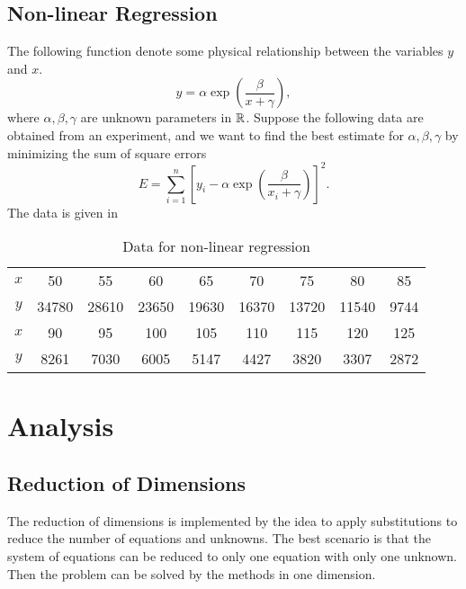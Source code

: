 \subsection{Non-linear Regression}
The following function denote some physical relationship between the variables \(y\) and \(x\).
\[ y=\alpha\exp\left(\frac{\beta}{x+\gamma}\right), \]
where \(\alpha,\beta,\gamma\) are unknown parameters in \(\mathbb{R}\).
Suppose the following data are obtained from an experiment, and we want to find the best estimate for \(\alpha,\beta,\gamma\) by minimizing the sum of square errors
\begin{equation}\label{sse}
E=\sum_{i=1}^{n} \left[  y_i-\alpha\exp\left(\frac{\beta}{x_i+\gamma}\right) \right]^2.
\end{equation}
The data is given in
\ifnum{}
	\begin{table}[H]
\else
	\begin{table}[htbp]
\fi
	\centering
	\begin{tabular}{ccccccccc}
	\hline
	\(x\)	&	50	&	55	&	60	&	65	&	70	&	75	&	80	&	85	\\
	\(y\)	&	34780	&	28610	&	23650	&	19630	&	16370	&	13720	&	11540	&	9744			\\	\hline\hline
	\(x\)	&	90	&	95	&	100	&	105	&	110	&	115	&	120	&	125 \\
	\(y\)	&	8261	&	7030	&	6005	&	5147	&	4427	&	3820	&	3307	&	2872	\\	\hline
	\end{tabular}
	\caption{Data for non-linear regression}
	\label{regression}
	\end{table}





\section{Analysis}
\subsection{Reduction of Dimensions}
The reduction of dimensions is implemented by the idea to apply substitutions to reduce the number of equations and unknowns.
The best scenario is that the system of equations can be reduced to only one equation with only one unknown. 
Then the problem can be solved by the methods in one dimension.


\end{table}
